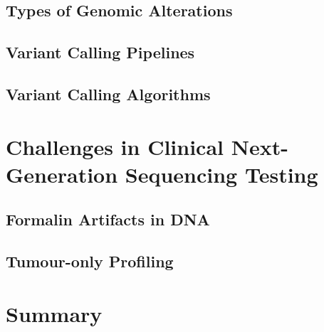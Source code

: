 \subsection{Types of Genomic Alterations}

\subsection{Variant Calling Pipelines}

\subsection{Variant Calling Algorithms}

\section{Challenges in Clinical Next-Generation Sequencing Testing}
\label{sec:Challenges in Clinical Next-Generation Sequencing Testing}

\subsection{Formalin Artifacts in DNA}

\subsection{Tumour-only Profiling}

\section{Summary}
\label{sec:Summary}


\endinput

The genetic basis of cancer made it a suitable candidate for the emerging Genomics-driven cancer medicine is an emerging framework for diagnosis, patient management, and therapeutic intervention based on individual genetic variability. This framework has been revolutionized by advanced massive parallel sequencing (MPS) technologies and analytic tools. The step-wise accumulation of genomic alterations plays a significant role in driving cancer initiation, maintenance, and progression. Somatic mutations in oncogenes and tumour-suppressor genes, which are collectively known as cancer genes, results in dysregulation in key onco

